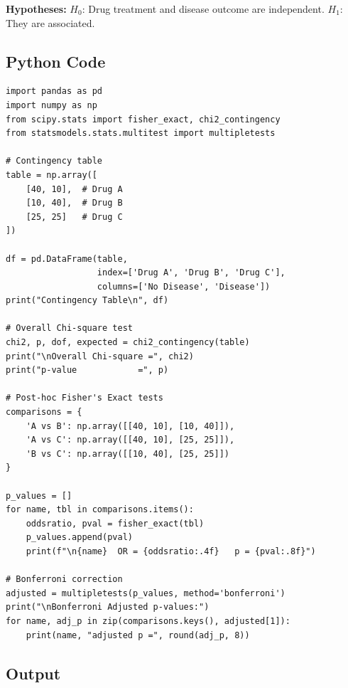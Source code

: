 \documentclass[12pt,a4paper]{article}
\begin{document}
\textbf{Hypotheses:} $H_0$: Drug treatment and disease outcome are independent. \quad $H_1$: They are associated.

\subsection{Python Code}

\begin{lstlisting}
import pandas as pd
import numpy as np
from scipy.stats import fisher_exact, chi2_contingency
from statsmodels.stats.multitest import multipletests

# Contingency table
table = np.array([
    [40, 10],  # Drug A
    [10, 40],  # Drug B
    [25, 25]   # Drug C
])

df = pd.DataFrame(table,
                  index=['Drug A', 'Drug B', 'Drug C'],
                  columns=['No Disease', 'Disease'])
print("Contingency Table\n", df)

# Overall Chi-square test
chi2, p, dof, expected = chi2_contingency(table)
print("\nOverall Chi-square =", chi2)
print("p-value            =", p)

# Post-hoc Fisher's Exact tests
comparisons = {
    'A vs B': np.array([[40, 10], [10, 40]]),
    'A vs C': np.array([[40, 10], [25, 25]]),
    'B vs C': np.array([[10, 40], [25, 25]])
}

p_values = []
for name, tbl in comparisons.items():
    oddsratio, pval = fisher_exact(tbl)
    p_values.append(pval)
    print(f"\n{name}  OR = {oddsratio:.4f}   p = {pval:.8f}")

# Bonferroni correction
adjusted = multipletests(p_values, method='bonferroni')
print("\nBonferroni Adjusted p-values:")
for name, adj_p in zip(comparisons.keys(), adjusted[1]):
    print(name, "adjusted p =", round(adj_p, 8))
\end{lstlisting}

\subsection{Output}
\end{document}
